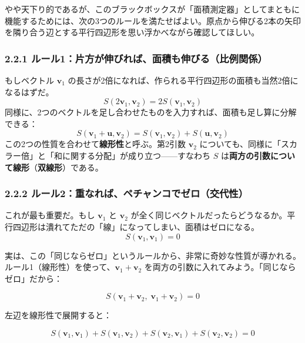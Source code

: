 \documentclass[a4paper,12pt,openany]{book}
\begin{document}
やや天下り的であるが、このブラックボックスが「面積測定器」としてまともに機能するためには、次の3つのルールを満たせばよい。原点から伸びる2本の矢印を隣り合う辺とする平行四辺形を思い浮かべながら確認してほしい。

\hypertarget{ux30ebux30fcux30eb1ux7247ux65b9ux304cux4f38ux3073ux308cux3070ux9762ux7a4dux3082ux4f38ux3073ux308bux6bd4ux4f8bux95a2ux4fc2}{%
\subsubsection{2.2.1
ルール1：片方が伸びれば、面積も伸びる（比例関係）}\label{ux30ebux30fcux30eb1ux7247ux65b9ux304cux4f38ux3073ux308cux3070ux9762ux7a4dux3082ux4f38ux3073ux308bux6bd4ux4f8bux95a2ux4fc2}}

もしベクトル \(\mathbf{v}_1\)
の長さが2倍になれば、作られる平行四辺形の面積も当然2倍になるはずだ。
\[S(2\mathbf{v}_1, \mathbf{v}_2) = 2 S(\mathbf{v}_1, \mathbf{v}_2)\]
同様に、2つのベクトルを足し合わせたものを入力すれば、面積も足し算に分解できる：
\[S(\mathbf{v}_1 + \mathbf{u}, \mathbf{v}_2) = S(\mathbf{v}_1, \mathbf{v}_2) + S(\mathbf{u}, \mathbf{v}_2)\]
この2つの性質を合わせて\textbf{線形性}と呼ぶ。第2引数 \(\mathbf{v}_2\)
についても、同様に「スカラー倍」と「和に関する分配」が成り立つ——すなわち
\(S\) は\textbf{両方の引数について線形}（\textbf{双線形}）である。

\hypertarget{ux30ebux30fcux30eb2ux91cdux306aux308cux3070ux30daux30c1ux30e3ux30f3ux30b3ux3067ux30bcux30edux4ea4ux4ee3ux6027}{%
\subsubsection{2.2.2
ルール2：重なれば、ペチャンコでゼロ（交代性）}\label{ux30ebux30fcux30eb2ux91cdux306aux308cux3070ux30daux30c1ux30e3ux30f3ux30b3ux3067ux30bcux30edux4ea4ux4ee3ux6027}}

これが最も重要だ。もし \(\mathbf{v}_1\) と \(\mathbf{v}_2\)
が全く同じベクトルだったらどうなるか。平行四辺形は潰れてただの「線」になってしまい、面積はゼロになる。
\[S(\mathbf{v}_1, \mathbf{v}_1) = 0\]

実は、この「同じならゼロ」というルールから、非常に奇妙な性質が導かれる。ルール1（線形性）を使って、\(\mathbf{v}_1 + \mathbf{v}_2\)
を両方の引数に入れてみよう。「同じならゼロ」だから：

\[S(\mathbf{v}_1 + \mathbf{v}_2,\; \mathbf{v}_1 + \mathbf{v}_2) = 0\]

左辺を線形性で展開すると：

\[S(\mathbf{v}_1, \mathbf{v}_1) + S(\mathbf{v}_1, \mathbf{v}_2) + S(\mathbf{v}_2, \mathbf{v}_1) + S(\mathbf{v}_2, \mathbf{v}_2) = 0\]
\end{document}
